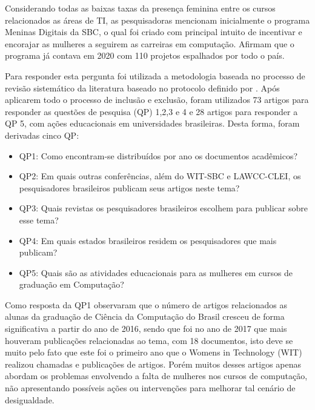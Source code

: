 Considerando todas as baixas taxas da presença feminina entre os cursos relacionados as áreas de TI, as pesquisadoras mencionam inicialmente o programa Meninas Digitais da SBC, o qual foi criado com principal intuito de incentivar e encorajar as mulheres a seguirem as carreiras em computação. Afirmam que o programa já contava em 2020 com 110 projetos espalhados por todo o país.

Para responder esta pergunta foi utilizada a metodologia baseada no processo de revisão
sistemático da literatura baseado no protocolo definido por . Após aplicarem todo o processo de inclusão e exclusão, foram utilizados 73 artigos para responder as questões de pesquisa (QP) 1,2,3 e 4 e 28 artigos para responder a QP 5, com ações educacionais em universidades brasileiras. Desta forma, foram derivadas cinco QP:


\begin{itemize}
    \item QP1: Como encontram-se distribuídos por ano os documentos acadêmicos?
    \item QP2: Em quais outras conferências, além do WIT-SBC e LAWCC-CLEI, os pesquisadores brasileiros publicam seus artigos neste tema?
    \item QP3: Quais revistas os pesquisadores brasileiros escolhem para publicar sobre esse tema?
    \item QP4: Em quais estados brasileiros residem os pesquisadores que mais publicam?
    \item QP5: Quais são as atividades educacionais para as mulheres em cursos de graduação em Computação?
\end{itemize}

Como resposta da QP1 observaram que o número de artigos relacionados as alunas da graduação de Ciência da Computação do Brasil cresceu de forma significativa a partir do ano de 2016, sendo que foi no ano de 2017 que mais houveram publicações relacionadas ao tema, com 18 documentos, isto deve se muito pelo fato que este foi o primeiro ano que o Womens in Technology (WIT) realizou chamadas e publicações de artigos. Porém muitos desses artigos apenas abordam os problemas envolvendo a falta de mulheres nos cursos de computação, não apresentando possíveis ações ou intervenções para melhorar tal cenário de desigualdade.

